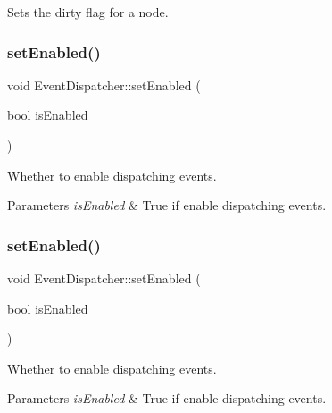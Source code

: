 Sets the dirty flag for a node. \mbox{\label{classEventDispatcher_a1fc28fe8361af5b2a2fb9b108d89da42}} 
\subsubsection{\texorpdfstring{set\+Enabled()}{setEnabled()}\hspace{0.1cm}{\footnotesize\ttfamily [1/2]}}
{\footnotesize\ttfamily void Event\+Dispatcher\+::set\+Enabled (\begin{DoxyParamCaption}\item[{bool}]{is\+Enabled }\end{DoxyParamCaption})}

Whether to enable dispatching events.


\begin{DoxyParams}{Parameters}
{\em is\+Enabled} & True if enable dispatching events. \\
\hline
\end{DoxyParams}
\mbox{\label{classEventDispatcher_a1fc28fe8361af5b2a2fb9b108d89da42}} 
\subsubsection{\texorpdfstring{set\+Enabled()}{setEnabled()}\hspace{0.1cm}{\footnotesize\ttfamily [2/2]}}
{\footnotesize\ttfamily void Event\+Dispatcher\+::set\+Enabled (\begin{DoxyParamCaption}\item[{bool}]{is\+Enabled }\end{DoxyParamCaption})}

Whether to enable dispatching events.


\begin{DoxyParams}{Parameters}
{\em is\+Enabled} & True if enable dispatching events. \\
\hline
\end{DoxyParams}
\mbox{\label{classEventDispatcher_a8368f3f3945977b5a5c3d0cc75f90cd5}} 
